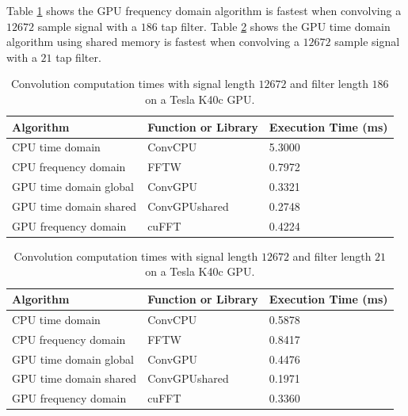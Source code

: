 Table \ref{tab:CPUvsGPUtable_12672_186} shows the GPU frequency domain algorithm is fastest when convolving a $12672$ sample signal with a $186$ tap filter.
Table \ref{tab:CPUvsGPUtable_12672_21} shows the GPU time domain algorithm using shared memory is fastest when convolving a $12672$ sample signal with a $21$ tap filter.
\begin{table}
\caption{Convolution computation times with signal length $12672$ and filter length $186$ on a Tesla K40c GPU.}
\begin{center}
\begin{tabular}{lll}
	\toprule
	Algorithm 				& Function or Library		& Execution Time (ms) \\ \midrule
	CPU time domain 		& ConvCPU 					& 5.3000		\\
	CPU frequency domain 	& FFTW 						& 0.7972		\\
	GPU time domain global 	& ConvGPU 					& 0.3321		\\
	GPU time domain shared 	& ConvGPUshared 			& 0.2748		\\
	GPU frequency domain 	& cuFFT						& 0.4224		\\ 
	\bottomrule
\end{tabular}
\end{center}
\label{tab:CPUvsGPUtable_12672_186}
\end{table}
\begin{table}
\caption{Convolution computation times with signal length $12672$ and filter length $21$ on a Tesla K40c GPU.}
\begin{center}
\begin{tabular}{lll}
	\toprule
	Algorithm 				& Function or Library		& Execution Time (ms) \\ \midrule
	CPU time domain 		& ConvCPU 					& 0.5878		\\
	CPU frequency domain 	& FFTW 						& 0.8417		\\
	GPU time domain global 	& ConvGPU 					& 0.4476		\\
	GPU time domain shared 	& ConvGPUshared 			& 0.1971		\\
	GPU frequency domain 	& cuFFT						& 0.3360		\\ 
	\bottomrule
\end{tabular}
\end{center}
\label{tab:CPUvsGPUtable_12672_21}
\end{table}

